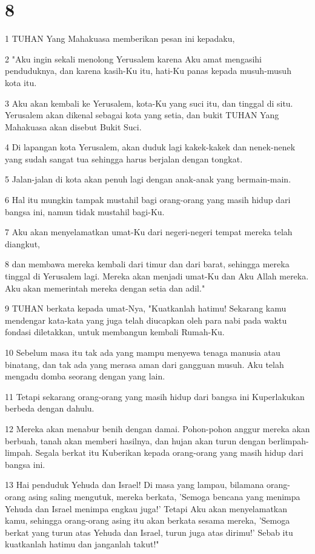 \chapter{8}

\par 1 TUHAN Yang Mahakuasa memberikan pesan ini kepadaku,
\par 2 "Aku ingin sekali menolong Yerusalem karena Aku amat mengasihi penduduknya, dan karena kasih-Ku itu, hati-Ku panas kepada musuh-musuh kota itu.
\par 3 Aku akan kembali ke Yerusalem, kota-Ku yang suci itu, dan tinggal di situ. Yerusalem akan dikenal sebagai kota yang setia, dan bukit TUHAN Yang Mahakuasa akan disebut Bukit Suci.
\par 4 Di lapangan kota Yerusalem, akan duduk lagi kakek-kakek dan nenek-nenek yang sudah sangat tua sehingga harus berjalan dengan tongkat.
\par 5 Jalan-jalan di kota akan penuh lagi dengan anak-anak yang bermain-main.
\par 6 Hal itu mungkin tampak mustahil bagi orang-orang yang masih hidup dari bangsa ini, namun tidak mustahil bagi-Ku.
\par 7 Aku akan menyelamatkan umat-Ku dari negeri-negeri tempat mereka telah diangkut,
\par 8 dan membawa mereka kembali dari timur dan dari barat, sehingga mereka tinggal di Yerusalem lagi. Mereka akan menjadi umat-Ku dan Aku Allah mereka. Aku akan memerintah mereka dengan setia dan adil."
\par 9 TUHAN berkata kepada umat-Nya, "Kuatkanlah hatimu! Sekarang kamu mendengar kata-kata yang juga telah diucapkan oleh para nabi pada waktu fondasi diletakkan, untuk membangun kembali Rumah-Ku.
\par 10 Sebelum masa itu tak ada yang mampu menyewa tenaga manusia atau binatang, dan tak ada yang merasa aman dari gangguan musuh. Aku telah mengadu domba seorang dengan yang lain.
\par 11 Tetapi sekarang orang-orang yang masih hidup dari bangsa ini Kuperlakukan berbeda dengan dahulu.
\par 12 Mereka akan menabur benih dengan damai. Pohon-pohon anggur mereka akan berbuah, tanah akan memberi hasilnya, dan hujan akan turun dengan berlimpah-limpah. Segala berkat itu Kuberikan kepada orang-orang yang masih hidup dari bangsa ini.
\par 13 Hai penduduk Yehuda dan Israel! Di masa yang lampau, bilamana orang-orang asing saling mengutuk, mereka berkata, 'Semoga bencana yang menimpa Yehuda dan Israel menimpa engkau juga!' Tetapi Aku akan menyelamatkan kamu, sehingga orang-orang asing itu akan berkata sesama mereka, 'Semoga berkat yang turun atas Yehuda dan Israel, turun juga atas dirimu!' Sebab itu kuatkanlah hatimu dan janganlah takut!"
